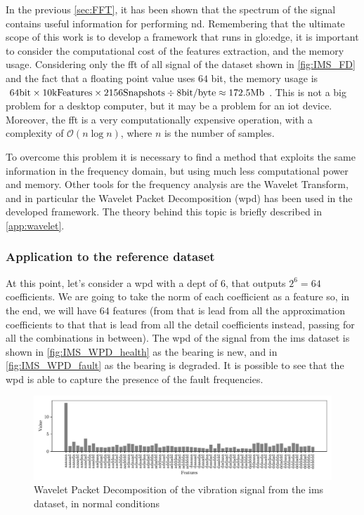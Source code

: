 In the previous \autoref{sec:FFT}, it has been shown that the spectrum of the signal contains useful information for performing \gls{nd}. Remembering that the ultimate scope of this work is to develop a framework that runs in \gls{glo:edge}, it is important to consider the computational cost of the features extraction, and the memory usage. Considering only the \gls{fft} of all signal of the dataset shown in \autoref{fig:IMS_FD} and the fact that a floating point value uses $64$ bit, the memory usage is $64 \si{\bit} \times 10 \text{kFeatures} \times 2156 \text{Snapshots} \div 8 \text{bit/byte} \approx 172.5 \text{Mb}$. This is not a big problem for a desktop computer, but it may be a problem for an \gls{iot} device. Moreover, the \gls{fft} is a very computationally expensive operation, with a complexity of $\mathcal{O}(n \log n)$, where $n$ is the number of samples.

To overcome this problem it is necessary to find a method that exploits the same information in the frequency domain, but using much less computational power and memory. Other tools for the frequency analysis are the Wavelet Transform, and in particular the Wavelet Packet Decomposition (\gls{wpd}) has been used in the developed framework. The theory behind this topic is briefly described in \autoref{app:wavelet}.

\subsubsection{Application to the reference dataset}

At this point, let's consider a \gls{wpd} with a dept of $6$, that outputs $2^6=64$ coefficients. We are going to take the norm of each coefficient as a feature so, in the end, we will have $64$ features (from  that is lead from all the approximation coefficients to  that that is lead from all the detail coefficients instead, passing for all the combinations in between). The \gls{wpd} of the  signal from the \gls{ims} dataset is shown in \autoref{fig:IMS_WPD_health} as the bearing is new, and in \autoref{fig:IMS_WPD_fault} as the bearing is degraded. It is possible to see that the \gls{wpd} is able to capture the presence of the fault frequencies.

\begin{figure}
    \centering
    \includegraphics[width=\textwidth]{images/FeatureExtraction/IMS_WPD_health.pdf}
    \caption{Wavelet Packet Decomposition of the  vibration signal from the \gls{ims} dataset, in normal conditions}
    \label{fig:IMS_WPD_health}
\end{figure}

